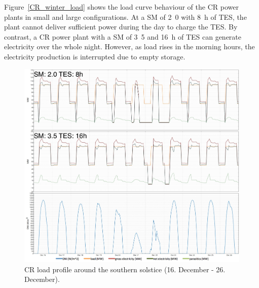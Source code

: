 Figure~\ref{CR_winter_load} shows the load curve behaviour of the CR power plants in small and large configurations. At a SM of \si{2.0} with \SI{8}{h} of TES, the plant cannot deliver sufficient power during the day to charge the TES. By contrast, a CR power plant with a SM of \si{3.5} and \SI{16}{h} of TES can generate electricity over the whole night. However, as load rises in the morning hours, the electricity production is interrupted due to empty storage. 

\begin{figure}[htbp]  
\centering
\includegraphics[width=1\linewidth]{FIG/CR_summer_load}
\caption[CR load profile around the southern solstice (16. December - 26. December).]{CR load profile around the southern solstice (16. December - 26. December).}\label{CR_summer_load}
\end{figure}

